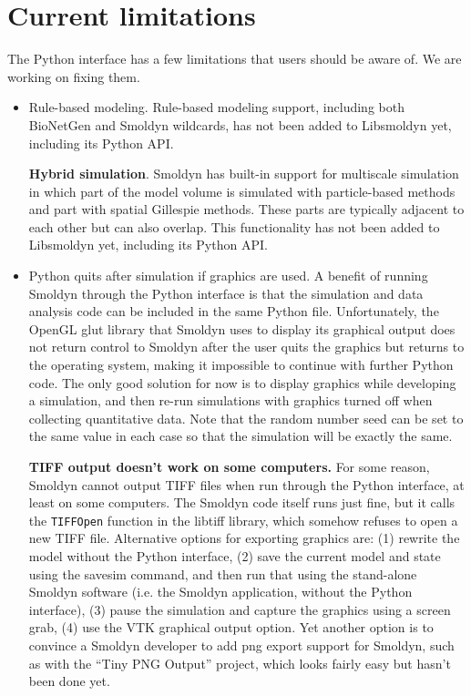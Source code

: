 \documentclass {scrbook}
\newcommand {\ttt} {\texttt}
\begin{document}
\section{Current limitations}

The Python interface has a few limitations that users should be aware of. We are working on fixing them.

\begin{itemize}

\item{Rule-based modeling}. Rule-based modeling support, including both BioNetGen and Smoldyn wildcards, has not been added to Libsmoldyn yet, including its Python API.

\textbf{Hybrid simulation}. Smoldyn has built-in support for multiscale simulation in which part of the model volume is simulated with particle-based methods and part with spatial Gillespie methods. These parts are typically adjacent to each other but can also overlap. This functionality has not been added to Libsmoldyn yet, including its Python API.

\item{Python quits after simulation if graphics are used}. A benefit of running Smoldyn through the Python interface is that the simulation and data analysis code can be included in the same Python file. Unfortunately, the OpenGL glut library that Smoldyn uses to display its graphical output does not return control to Smoldyn after the user quits the graphics but returns to the operating system, making it impossible to continue with further Python code. The only good solution for now is to display graphics while developing a simulation, and then re-run simulations with graphics turned off when collecting quantitative data. Note that the random number seed can be set to the same value in each case so that the simulation will be exactly the same.

\textbf{TIFF output doesn't work on some computers.} For some reason, Smoldyn cannot output TIFF files when run through the Python interface, at least on some computers. The Smoldyn code itself runs just fine, but it calls the \ttt{TIFFOpen} function in the libtiff library, which somehow refuses to open a new TIFF file. Alternative options for exporting graphics are: (1) rewrite the model without the Python interface, (2) save the current model and state using the savesim command, and then run that using the stand-alone Smoldyn software (i.e. the Smoldyn application, without the Python interface), (3) pause the simulation and capture the graphics using a screen grab, (4) use the VTK graphical output option. Yet another option is to convince a Smoldyn developer to add png export support for Smoldyn, such as with the ``Tiny PNG Output'' project, which looks fairly easy but hasn't been done yet.

\end{itemize}
\end{document}
